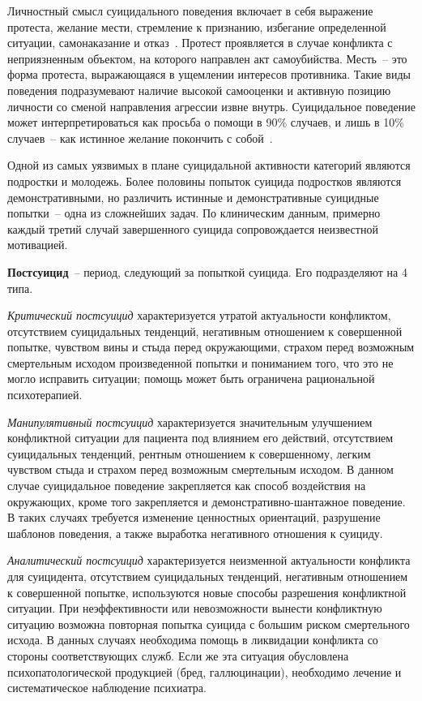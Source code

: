 Личностный смысл суицидального поведения включает в себя выражение протеста, желание мести, стремление к признанию, избегание определенной ситуации, самонаказание и отказ~\cite{starsen}. 
Протест проявляется в случае конфликта с неприязненным объектом, на которого направлен акт самоубийства. 
Месть~-- это форма протеста, выражающаяся в ущемлении интересов противника. Такие виды поведения подразумевают наличие высокой самооценки и активную позицию личности со сменой направления агрессии извне внутрь.
Суицидальное поведение может интерпретироваться как просьба о помощи в 90\% случаев, и лишь в 10\% случаев~-- как истинное желание покончить с собой~\cite{Kasyanov}.

Одной из самых уязвимых в плане суицидальной активности категорий являются подростки и молодежь. 
Более половины попыток суицида подростков являются демонстративными, но различить истинные и демонстративные суицидные попытки~-- одна из сложнейших задач. 
По клиническим данным, примерно каждый третий случай завершенного суицида сопровождается неизвестной мотивацией.~\cite{suicidalContent}

\textbf{Постсуицид}~-- период, следующий за попыткой суицида. Его подразделяют на 4 типа.~\cite{starsen}

\textit{Критический постсуицид} характеризуется утратой актуальности конфликтом, отсутствием суицидальных тенденций, негативным отношением к совершенной попытке, чувством вины и стыда перед окружающими, страхом перед возможным смертельным исходом произведенной попытки и пониманием того, что это не могло исправить ситуации; помощь может быть ограничена рациональной психотерапией.~\cite{starsen}

\textit{Манипулятивный постсуицид} характеризуется значительным улучшением конфликтной ситуации для пациента под влиянием его действий, отсутствием суицидальных тенденций, рентным отношением к совершенному, легким чувством стыда и страхом перед возможным смертельным исходом. 
В данном случае суицидальное поведение закрепляется как способ воздействия на окружающих, кроме того закрепляется и демонстративно-шантажное поведение. В таких случаях требуется изменение ценностных ориентаций, разрушение шаблонов поведения, а также выработка негативного отношения к суициду.~\cite{starsen}

\textit{Аналитический постсуицид} характеризуется неизменной актуальности конфликта для суицидента, отсутствием суицидальных тенденций, негативным отношением к совершенной попытке, используются новые способы разрешения конфликтной ситуации. 
При неэффективности или невозможности вынести конфликтную ситуацию возможна повторная попытка суицида с большим риском смертельного исхода. 
В данных случаях необходима помощь в ликвидации конфликта со стороны соответствующих служб. 
Если же эта ситуация обусловлена психопатологической продукцией (бред, галлюцинации), необходимо лечение и систематическое наблюдение психиатра.~\cite{starsen}

